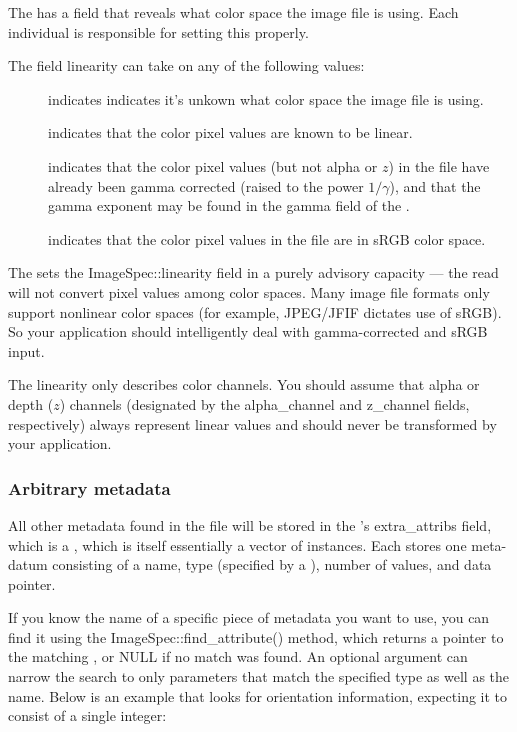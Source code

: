 The \ImageSpec has a field that reveals what color space the
image file is using.  Each individual \ImageInput is responsible for
setting this properly.

The \ImageSpec field {\cf linearity} can take on any of the
following values:
\begin{description}
\item[\halfspc \rm {}] indicates
  indicates it's unkown what color space the image file is using.
\item[\halfspc \rm {}] indicates that the
  color pixel values are known to be linear.
\item[\halfspc \rm {}] indicates
  that the color pixel values (but not alpha or $z$) in the file have
  already been gamma corrected (raised to the power $1/\gamma$), and
  that the gamma exponent may be found in the {\cf gamma} field of the
  \ImageSpec.
\item[\halfspc \rm {}] indicates that the
  color pixel values in the file are in sRGB color space.
\end{description}

The \ImageInput sets the {\cf ImageSpec::linearity} field in a
purely advisory capacity --- the {\cf read} will not convert pixel
values among color spaces.  Many image file formats only support
nonlinear color spaces (for example, JPEG/JFIF dictates use of sRGB).
So your application should intelligently deal with gamma-corrected and
sRGB input.

The linearity only describes color channels.  You should assume that
alpha or depth ($z$) channels (designated by the {\cf alpha_channel} and
{\cf z_channel} fields, respectively) always represent linear values and
should never be transformed by your application.

\subsubsection{Arbitrary metadata}

All other metadata found in the file will be stored in the
\ImageSpec's {\cf extra_attribs} field, which is a 
\ParamValueList, which is itself essentially a vector of
\ParamValue instances.  Each \ParamValue
stores one meta-datum consisting of a name, type (specified by 
a \TypeDesc), number of values, and data pointer.

If you know the name of a specific piece of metadata you want to use,
you can find it using the {\cf ImageSpec::find_attribute()}
method, which returns a pointer to the matching \ParamValue,
or {\cf NULL} if no match was found.  An optional \TypeDesc
argument can narrow the search to only parameters that match the
specified type as well as the name.  Below is an
example that looks for orientation information, expecting it to consist 
of a single integer:

